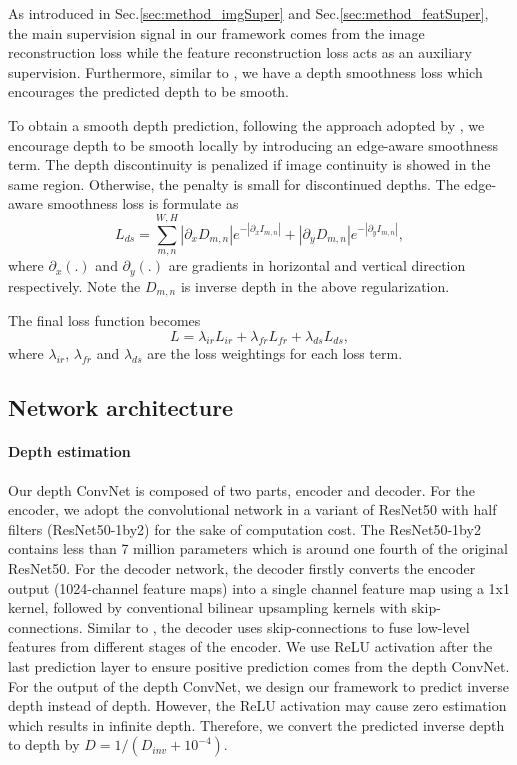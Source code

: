 \documentclass[10pt,twocolumn,letterpaper]{article}
\begin{document}
As introduced in Sec.\ref{sec:method_imgSuper} and Sec.\ref{sec:method_featSuper}, the main supervision signal in our framework comes from the image reconstruction loss while the feature reconstruction loss acts as an auxiliary supervision. Furthermore, similar to \cite{garg2016depth}\cite{zhou2017sfmlearner}\cite{godard2016depth}, we have a depth smoothness loss which encourages the predicted depth to be smooth.

To obtain a smooth depth prediction, following the approach adopted by \cite{heise2013pm}\cite{godard2016depth}, we encourage depth to be smooth locally by introducing an edge-aware smoothness term. The depth discontinuity is penalized if image continuity is showed in the same region. Otherwise, the penalty is small for discontinued depths.
The edge-aware smoothness loss is formulate as
% 
\begin{equation}
    L_{ds} = \sum_{m,n}^{W,H}
    |\partial_x D_{m,n}| e^{-|{\partial_x I_{m,n}}|}+
    |\partial_y D_{m,n}| e^{-|{\partial_y I_{m,n}}|},
\end{equation}
% 
where $\partial_x(.)$ and $\partial_y(.)$ are gradients in horizontal and vertical direction respectively. Note the $D_{m,n}$ is inverse depth in the above regularization.

The final loss function becomes 
\begin{equation}
    L =
    \lambda_{ir} L_{ir} + 
    \lambda_{fr} L_{fr} +
    \lambda_{ds} L_{ds},
\end{equation}
where $\lambda_{ir}$, $\lambda_{fr}$ and $\lambda_{ds}$ are the loss weightings for each loss term.


\subsection{Network architecture} \label{sec:method_netArchi}
\paragraph{Depth estimation}

Our depth ConvNet is composed of two parts, encoder and decoder. 
For the encoder, we adopt the convolutional network in a variant of ResNet50 \cite{he2016resnet} with half filters (ResNet50-1by2)  for the sake of computation cost. The ResNet50-1by2 contains less than 7 million parameters which is around one fourth of the original ResNet50. For the decoder network, the decoder firstly converts the encoder output (1024-channel feature maps) into a single channel feature map using a 1x1 kernel, followed by conventional bilinear upsampling kernels with skip-connections.
Similar to \cite{long2015fcn}\cite{garg2016depth}\cite{godard2016depth}, the decoder uses skip-connections to fuse low-level features from different stages of the encoder. 
We use ReLU activation after the last prediction layer to ensure positive prediction comes from the depth ConvNet. For the output of the depth ConvNet, we design our framework to predict inverse depth instead of depth. However, the ReLU activation may cause zero estimation which results in infinite depth. Therefore, we convert the predicted inverse depth to depth by $D = 1/(D_{inv}+10^{-4})$.
\end{document}
